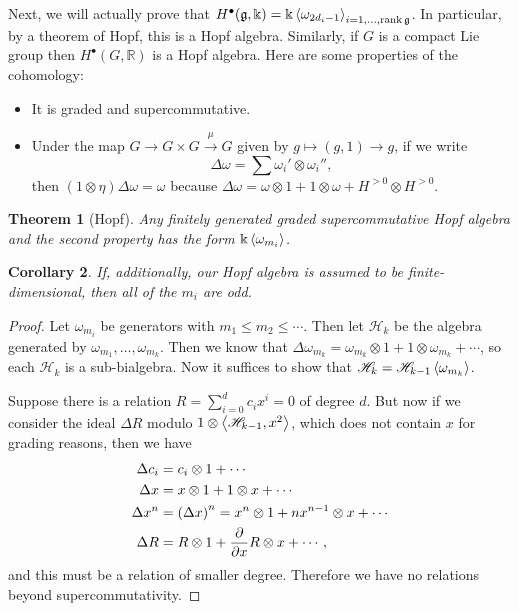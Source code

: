 \documentclass[leqno, openany]{memoir}
\newtheorem{thm}{Theorem}[section]
\newtheorem{cor}[thm]{Corollary}
\theoremstyle{definition}
\theoremstyle{remark}
\theoremstyle{plain}
\theoremstyle{definition}
\theoremstyle{remark}
\newcommand{\R}{\mathbb{R}}
\renewcommand{\k}{\Bbbk}
\newcommand{\mf}[1]{\mathfrak{#1}}
\begin{document}
Next, we will actually prove that $H^{\bullet}(\mf{g}, \k) = \k \ev{\omega_{2d_i - 1}}_{i = 1, \ldots, \rank \mf{g}}$. In particular, by a theorem of Hopf, this is a Hopf algebra. Similarly, if $G$ is a compact Lie group then $H^{\bullet}(G, \R)$ is a Hopf algebra. Here are some properties of the cohomology:
\begin{itemize}
    \item It is graded and supercommutative.
    \item Under the map $G \to G \times G \xrightarrow{\mu} G$ given by $g \mapsto (g, 1) \to g$, if we write
        \[ \Delta \omega = \sum \omega_i' \otimes \omega_i'', \]
        then $(1 \otimes \eta) \Delta \omega = \omega$ because $\Delta \omega = \omega \otimes 1 + 1 \otimes \omega + H^{>0} \otimes H^{>0}$.
\end{itemize}

\begin{thm}[Hopf]
    Any finitely generated graded supercommutative Hopf algebra and the second property has the form $\k \ev{\omega_{m_i}}$.
\end{thm}

\begin{cor}
    If, additionally, our Hopf algebra is assumed to be finite-dimensional, then all of the $m_i$ are odd.
\end{cor}

\begin{proof}
    Let $\omega_{m_i}$ be generators with $m_1 \leq m_2 \leq \cdots$. Then let $\mathscr{H}_k$ be the algebra generated by $\omega_{m_1}, \ldots, \omega_{m_k}$. Then we know that $\Delta \omega_{m_k} = \omega_{m_k} \otimes 1 + 1 \otimes \omega_{m_k} + \cdots$, so each $\mathscr{H}_k$ is a sub-bialgebra. Now it suffices to show that $\mathscr{H}_k = \mathscr{H}_{k-1} \ev{\omega_{m_k}}$.

    Suppose there is a relation $R = \sum_{i=0}^d c_i x^i = 0$ of degree $d$. But now if we consider the ideal $\Delta R$ modulo $1 \otimes \ev{\mathscr{H}_{k-1}, x^2}$, which does not contain $x$ for grading reasons, then we have
    \begin{align*}
        \Delta c_i &= c_i \otimes 1 + \cdots \\
        \Delta x &= x \otimes 1 + 1 \otimes x + \cdots \\
        \Delta x^n &= {(\Delta x)}^n = x^n \otimes 1 + nx^{n-1} \otimes x + \cdots \\
        \Delta R &= R \otimes 1 + \pdv{x} R \otimes x + \cdots,
    \end{align*}
    and this must be a relation of smaller degree. Therefore we have no relations beyond supercommutativity.
\end{proof}
\end{document}

